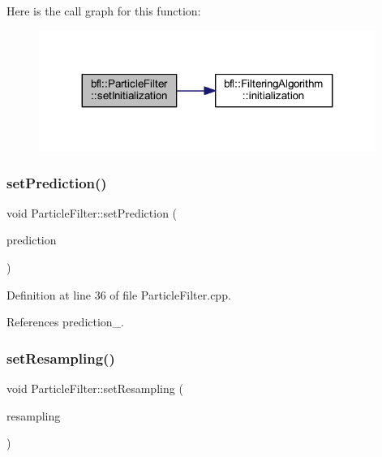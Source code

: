 Here is the call graph for this function\+:
\nopagebreak
\begin{figure}[H]
\begin{center}
\leavevmode
\includegraphics[width=311pt]{classbfl_1_1ParticleFilter_abfeb75fd575802f362039c26169eed8b_cgraph}
\end{center}
\end{figure}
\mbox{\label{classbfl_1_1ParticleFilter_a213811368143c1f498c87be70cf02379}} 
\subsubsection{\texorpdfstring{set\+Prediction()}{setPrediction()}}
{\footnotesize\ttfamily void Particle\+Filter\+::set\+Prediction (\begin{DoxyParamCaption}\item[{std\+::unique\+\_\+ptr$<$ \mbox{\hyperlink{classbfl_1_1PFPrediction}{P\+F\+Prediction}} $>$}]{prediction }\end{DoxyParamCaption})}



Definition at line 36 of file Particle\+Filter.\+cpp.



References prediction\+\_\+.

\mbox{\label{classbfl_1_1ParticleFilter_ad1618ed06b6e6e143e309e2267b970ee}} 
\subsubsection{\texorpdfstring{set\+Resampling()}{setResampling()}}
{\footnotesize\ttfamily void Particle\+Filter\+::set\+Resampling (\begin{DoxyParamCaption}\item[{std\+::unique\+\_\+ptr$<$ \mbox{\hyperlink{classbfl_1_1Resampling}{Resampling}} $>$}]{resampling }\end{DoxyParamCaption})}



